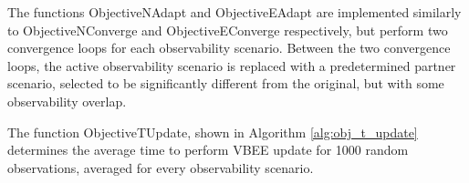 The functions ObjectiveNAdapt and ObjectiveEAdapt are implemented similarly to ObjectiveNConverge and ObjectiveEConverge respectively, but perform two convergence loops for each observability scenario. Between the two convergence loops, the active observability scenario is replaced with a predetermined partner scenario, selected to be significantly different from the original, but with some observability overlap.

The function ObjectiveTUpdate, shown in Algorithm \ref{alg:obj_t_update} determines the average time to perform VBEE update for 1000 random observations, averaged for every observability scenario.

\begin{singlespace}
    \begin{algorithm}[H]
        \caption[Objective Function: $t_{update}$]{ObjectiveTUpdate}
        \label{alg:obj_t_update}
        \begin{algorithmic}
                 
                \EndFor
            \EndFor
            \EndFunction
        \end{algorithmic}
    \end{algorithm}
\end{singlespace}

